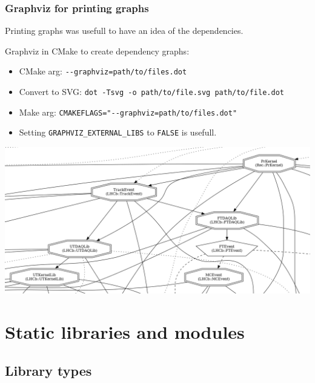 \documentclass{beamer}
\begin{document}
    \begin{frame}[fragile]
        \frametitle{Graphviz for printing graphs}

        Printing graphs was usefull to have an idea of the dependencies.

        Graphviz in CMake to create dependency graphs:
        \begin{itemize}
            \item CMake arg: \verb'--graphviz=path/to/files.dot'
            \item Convert to SVG: \verb'dot -Tsvg -o path/to/file.svg path/to/file.dot'
            \item Make arg: \verb'CMAKEFLAGS="--graphviz=path/to/files.dot"'
            \item Setting \verb'GRAPHVIZ_EXTERNAL_LIBS' to \verb'FALSE' is usefull.
        \end{itemize}

    \end{frame}

    \begin{frame}
        \includegraphics[width=\textwidth]{graphviz_cropped.png}
    \end{frame}

\section{Static libraries and modules}

    \begin{frame}
        \tableofcontents[currentsection]
    \end{frame}

    \subsection{Library types}
\end{document}

